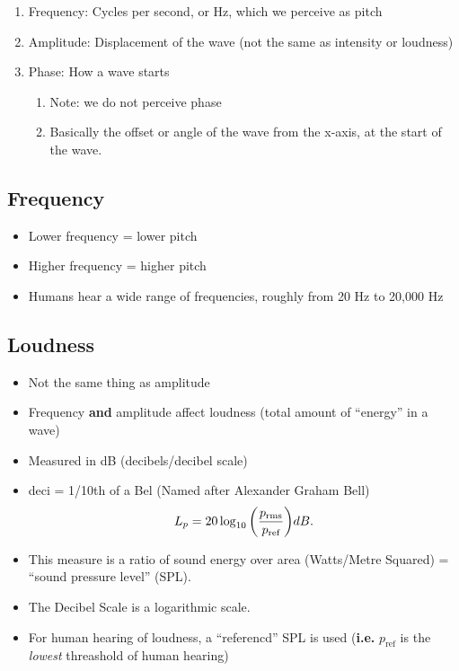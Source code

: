 \documentclass[12pt]{article}
\newcommand{\ie}{\textbf{i.e.}\xspace}
\begin{document}
\begin{enumerate}
  \item Frequency: Cycles per second, or Hz, which we perceive as pitch
  \item Amplitude: Displacement of the wave (not the same as intensity or loudness)
  \item Phase: How a wave starts
    \begin{enumerate}
      \item Note: we do not perceive phase
      \item Basically the offset or angle of the wave from the x-axis, at the start
        of the wave.
    \end{enumerate}
\end{enumerate}

\subsection{Frequency}

\begin{itemize}
\item Lower frequency = lower pitch
\item Higher frequency = higher pitch
\item Humans hear a wide range of frequencies, roughly from 20 Hz to 20,000 Hz
\end{itemize}

\subsection{Loudness}

\begin{itemize}
  \item Not the same thing as amplitude
  \item Frequency \textbf{and} amplitude affect loudness (total amount of
    \enquote{energy} in a wave)
  \item Measured in dB (decibels/decibel scale)
  \item deci = 1/10th of a Bel (Named after Alexander Graham Bell)
    \[
      L_p = 20\log_{10}\pqty{\frac{p_{\text{rms}}}{p_{\text{ref}}}} dB
    .\]
  \item This measure is a ratio of sound energy over area (Watts/Metre Squared)
    = \enquote{sound pressure level} (SPL).
  \item The Decibel Scale is a logarithmic scale. 
  \item For human hearing of loudness, a \enquote{referencd} SPL is used (\ie
    $p_{\text{ref}}$ is the \textit{lowest} threashold of human hearing)
\end{itemize}
\end{document}
